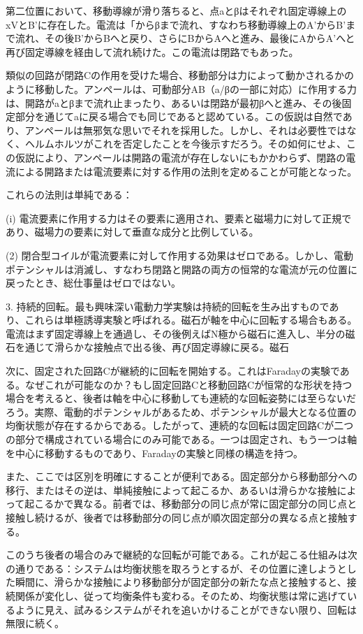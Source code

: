 \documentclass[a4paper,11pt,openany]{ltjsbook}
\begin{document}
第二位置において、移動導線が滑り落ちると、点aとβはそれぞれ固定導線上のxVとB'に存在した。電流は「からβまで流れ、すなわち移動導線上のA'からB'まで流れ、その後B'からBへと戻り、さらにBからAへと進み、最後にAからA'へと再び固定導線を経由して流れ続けた。この電流は閉路でもあった。

類似の回路が閉路Cの作用を受けた場合、移動部分は力によって動かされるかのように移動した。アンペールは、可動部分AB（a/βの一部に対応）に作用する力は、開路がaとβまで流れ止まったり、あるいは閉路が最初βへと進み、その後固定部分を通じてaに戻る場合でも同じであると認めている。この仮説は自然であり、アンペールは無邪気な思いでそれを採用した。しかし、それは必要性ではなく、ヘルムホルツがこれを否定したことを今後示すだろう。その如何にせよ、この仮説により、アンペールは開路の電流が存在しないにもかかわらず、閉路の電流による開路または電流要素に対する作用の法則を定めることが可能となった。

これらの法則は単純である：

(i) 電流要素に作用する力はその要素に適用され、要素と磁場力に対して正規であり、磁場力の要素に対して垂直な成分と比例している。

(2) 閉合型コイルが電流要素に対して作用する効果はゼロである。しかし、電動ポテンシャルは消滅し、すなわち閉路と開路の両方の恒常的な電流が元の位置に戻ったとき、総仕事量はゼロではない。

3. 持続的回転。最も興味深い電動力学実験は持続的回転を生み出すものであり、これらは単極誘導実験と呼ばれる。磁石が軸を中心に回転する場合もある。電流はまず固定導線上を通過し、その後例えばN極から磁石に進入し、半分の磁石を通じて滑らかな接触点で出る後、再び固定導線に戻る。磁石

次に、固定された回路Cが継続的に回転を開始する。これはFaradayの実験である。なぜこれが可能なのか？もし固定回路Cと移動回路Cが恒常的な形状を持つ場合を考えると、後者は軸を中心に移動しても連続的な回転姿勢には至らないだろう。実際、電動的ポテンシャルがあるため、ポテンシャルが最大となる位置の均衡状態が存在するからである。したがって、連続的な回転は固定回路Cが二つの部分で構成されている場合にのみ可能である。一つは固定され、もう一つは軸を中心に移動するものであり、Faradayの実験と同様の構造を持つ。

また、ここでは区別を明確にすることが便利である。固定部分から移動部分への移行、またはその逆は、単純接触によって起こるか、あるいは滑らかな接触によって起こるかで異なる。前者では、移動部分の同じ点が常に固定部分の同じ点と接触し続けるが、後者では移動部分の同じ点が順次固定部分の異なる点と接触する。

このうち後者の場合のみで継続的な回転が可能である。これが起こる仕組みは次の通りである：システムは均衡状態を取ろうとするが、その位置に達しようとした瞬間に、滑らかな接触により移動部分が固定部分の新たな点と接触すると、接続関係が変化し、従って均衡条件も変わる。そのため、均衡状態は常に逃げているように見え、試みるシステムがそれを追いかけることができない限り、回転は無限に続く。
\end{document}
